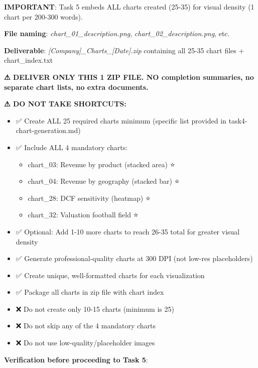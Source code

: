 \documentclass[11pt]{article}
\begin{document}
\textbf{IMPORTANT}: Task 5 embeds ALL charts created (25-35) for visual density (1 chart per 200-300 words).


\textbf{File naming}: \emph{chart\_\allowbreak{}01\_\allowbreak{}description.png}, \emph{chart\_\allowbreak{}02\_\allowbreak{}description.png}, etc.


\textbf{Deliverable}: \emph{[Company]\_\allowbreak{}Charts\_\allowbreak{}[Date].zip} containing all 25-35 chart files + chart\_\allowbreak{}index.txt


\textbf{⚠ DELIVER ONLY THIS 1 ZIP FILE. NO completion summaries, no separate chart lists, no extra documents.}


\textbf{⚠ DO NOT TAKE SHORTCUTS:}

\begin{itemize}[leftmargin=*,itemsep=2pt,topsep=2pt]
\item {} ✅ Create ALL 25 required charts minimum (specific list provided in task4-chart-generation.md)
\item {} ✅ Include ALL 4 mandatory charts:
\begin{itemize}[leftmargin=*,itemsep=2pt,topsep=2pt]
\item {} chart\_\allowbreak{}03: Revenue by product (stacked area) ⭐
\item {} chart\_\allowbreak{}04: Revenue by geography (stacked bar) ⭐
\item {} chart\_\allowbreak{}28: DCF sensitivity (heatmap) ⭐
\item {} chart\_\allowbreak{}32: Valuation football field ⭐
\end{itemize}
\item {} ✅ Optional: Add 1-10 more charts to reach 26-35 total for greater visual density
\item {} ✅ Generate professional-quality charts at 300 DPI (not low-res placeholders)
\item {} ✅ Create unique, well-formatted charts for each visualization
\item {} ✅ Package all charts in zip file with chart index
\item {} ❌ Do not create only 10-15 charts (minimum is 25)
\item {} ❌ Do not skip any of the 4 mandatory charts
\item {} ❌ Do not use low-quality/placeholder images
\end{itemize}

\textbf{Verification before proceeding to Task 5}:
\end{document}
